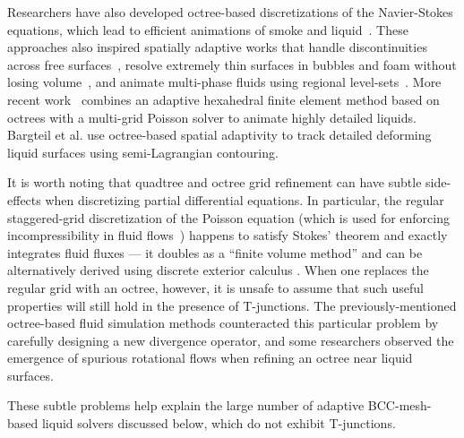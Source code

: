 Researchers have also developed octree-based discretizations of the Navier-Stokes equations, which lead to efficient animations of smoke and liquid~\cite{Shi2004,Losasso2004,Losasso2005}.
These approaches also inspired spatially adaptive works that handle discontinuities across free surfaces~\cite{Hong2005}, resolve extremely thin surfaces in bubbles and foam without losing volume~\cite{Kim2007}, and animate multi-phase fluids using regional level-sets~\cite{Kim2010MultiPhase}. More recent work~\cite{Ferstl2014} combines an adaptive hexahedral finite element method based on octrees with a multi-grid Poisson solver to animate highly detailed liquids. Bargteil et al. \cite{Bargteil2006} use octree-based spatial adaptivity to track detailed deforming liquid surfaces using semi-Lagrangian contouring.

It is worth noting that quadtree and octree grid refinement can have subtle side-effects when discretizing partial differential equations. In particular, the regular staggered-grid discretization of the Poisson equation (which is used for enforcing incompressibility in fluid flows~\cite{Bridson2008}) happens to satisfy Stokes' theorem and exactly integrates fluid fluxes --- it doubles as a ``finite volume method'' and can be alternatively derived using discrete exterior calculus \cite{Crane:2013:DGP}. When one replaces the regular grid with an octree, however, it is unsafe to assume that such useful properties will still hold in the presence of T-junctions. The previously-mentioned octree-based fluid simulation methods counteracted this particular problem by carefully designing a new divergence operator, and some researchers observed the emergence of spurious rotational flows when refining an octree near liquid surfaces. 

These subtle problems help explain the large number of adaptive BCC-mesh-based liquid solvers discussed below, which do not exhibit T-junctions.

